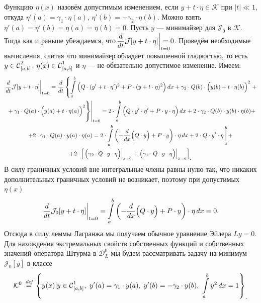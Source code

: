 \documentclass[12pt,a4paper,openany,fleqn]{book}
\newcommand {\defeq}{\stackrel{\hspace{0.09 cm}de\!f}{=}}
\newcommand {\eqdef}{\defeq}
\newcommand{\Cf}{\ensuremath{\mathcal{C}}}
\newcommand{\J}{\ensuremath{\mathcal{J}}}
\newcommand{\mc}[1]{\ensuremath{\mathcal{#1}}}
\newcommand{\Cfn}[2][]{\ensuremath{\Cf{\mathstrut}^{#2}_{#1}}}
\newcommand{\der}[2]{\ensuremath{\frac{d#1}{d#2}}}
\newcommand{\K}{\mc{K}}
\theoremstyle{definition}
\begin{document}
	 Функцию $\eta(x)$ назовём допустимым изменением, если $y+t\cdot\eta\in\K$ при $|t|\ll1$, откуда $\eta'(a)={\gamma_1\cdot\eta(a)}$, $\eta'(b)=-\gamma_2\cdot\eta(b)$. Можно взять $\eta'(a)=\eta'(b)=\eta(a)=\eta(b)=0$. Пусть $y$ --- минимайзер для $\J_0$ в $\K$. Тогда как и раньше убеждаемся, что$\displaystyle\left.\der{}{t}\J[y+t\cdot\eta]\right|_{\lefteqn{\scriptstyle t=0}}=0$. Проведём необходимые вычисления, считая что минимайзер обладает повышенной гладкостью, то есть $y\in\Cfn[{[a,b]}]{2}$, ${\eta(x)\in\Cfn[{[a,b]}]{1}}$ и $\eta$ --- не обязательно допустимое изменение. Имеем:
	\begin{multline*}
		\left.\der{}{t}\J[y+t\cdot\eta]\right|_{t=0}=\der{}{t}\left\{\int\limits_a^b\Big( Q\cdot(y'+t\cdot\eta')^2+P\cdot(y+t\cdot\eta)^2\Big)\,dx+\gamma_2\cdot Q(b)\cdot\Big(y(b)+t\cdot\eta(b)\Big)^2\right.+\\\left.\left.\vphantom{\int\limits_a^b}+\gamma_1\cdot Q(a)\cdot\Big(y(a)+t\cdot\eta(a)\Big)^2\right\}\right|_{t=0}=2\cdot\int\limits_a^b\Big(Q\cdot y'\cdot\eta'+P\cdot y\cdot\eta\Big)\,dx+2\cdot\gamma_2\cdot Q(b)\cdot y(b)\cdot\eta(b)+\\
		+2\cdot\gamma_1\cdot Q(a)\cdot y(a)\cdot\eta(a)=2\cdot\int\limits_a^b\left(-\der{}{x}\Big(Q\cdot y\Big)+P\cdot y\right)\cdot\eta\,dx+2\cdot Q\cdot y'\cdot\eta\mathop{\Big|}\limits_a^b+\\
		+2\cdot\left[\left.\Big(\gamma_2\cdot Q\cdot y\cdot\eta\Big)\right|_{ x=b}+\left.\Big(\gamma_1\cdot Q\cdot y\cdot\eta\Big)\right|_{ x=a}\right]_{\displaystyle.}
	\end{multline*} 
	В силу граничных условий вне интегральные члены равны нулю так, что никаких дополнительных граничных условий не возникает, поэтому при допустимых $\eta(x)$
	\begin{equation*}
		\hfill\left.\der{}{t}\J_0[y+t\cdot\eta]\right|_{t=0}=\int\limits_a^b\left(-\der{}{x}\Big(Q\cdot y\Big)+P\cdot y\right)\cdot\eta\,dx=0.\hfill
	\end{equation*} 
	Отсюда в силу леммы Лагранжа мы получаем обычное уравнение Эйлера $Ly=0$. Для нахождения экстремальных свойств собственных функций и собственных значений оператора Штурма в $\mc{D}_L^0$ мы будем рассматривать задачу на минимум $\J_0[y]$ в классе 
	\begin{equation*}
		\hfill\K^0\eqdef\left\{y(x)|y\in\Cfn[{[a,b]}]{1},\ y'(a)=\gamma_1\cdot y(a),\;y'(b)=-\gamma_2\cdot y(b),\ \int\limits_a^b y^2\,dx=1\right\}_{\displaystyle.}\hfill
	\end{equation*}
\end{document}
